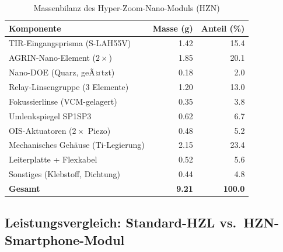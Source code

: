﻿\documentclass[12pt,a4paper]{article}
\theoremstyle{definition}
\begin{document}
	\begin{table}[H]
		\centering
		\caption{Massenbilanz des Hyper-Zoom-Nano-Moduls (HZN)}
		\label{tab:mass_budget}
		\begin{tabular}{lrr}
			\toprule
			\textbf{Komponente} & \textbf{Masse (g)} & \textbf{Anteil (\%)}\\
			\midrule
			\rowcolor{blue!8}
			TIR-Eingangsprisma (S-LAH55V)       & 1.42 & 15.4 \\
			AGRIN-Nano-Element ($2\times$)       & 1.85 & 20.1 \\
			\rowcolor{blue!8}
			Nano-DOE (Quarz, geÃ¤tzt)             & 0.18 &  2.0 \\
			Relay-Linsengruppe (3 Elemente)      & 1.20 & 13.0 \\
			\rowcolor{blue!8}
			Fokussierlinse (VCM-gelagert)        & 0.35 &  3.8 \\
			Umlenkspiegel SP1\textendash SP3     & 0.62 &  6.7 \\
			\rowcolor{blue!8}
			OIS-Aktuatoren ($2\times$ Piezo)     & 0.48 &  5.2 \\
			Mechanisches Geh\"ause (Ti-Legierung)& 2.15 & 23.4 \\
			\rowcolor{blue!8}
			Leiterplatte + Flexkabel             & 0.52 &  5.6 \\
			Sonstiges (Klebstoff, Dichtung)      & 0.44 &  4.8 \\
			\midrule
			\textbf{Gesamt}                      & \textbf{9.21} & \textbf{100.0} \\
			\bottomrule
		\end{tabular}
	\end{table}

	\subsection{Leistungsvergleich: Standard-HZL vs.\ HZN-Smartphone-Modul}
\end{document}
